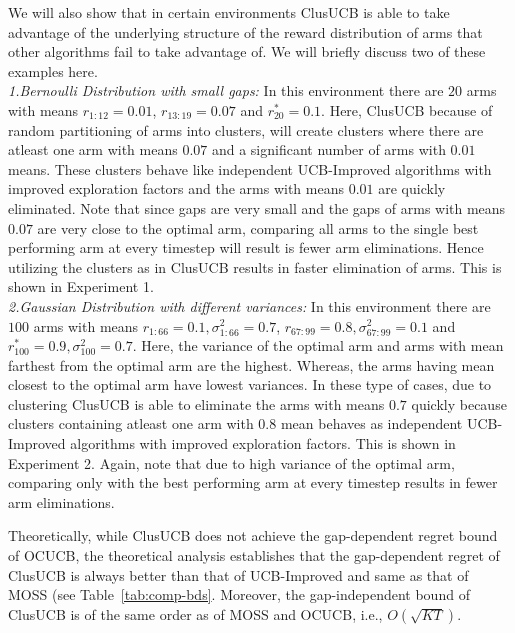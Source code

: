 We will also show that in certain environments ClusUCB is able to take advantage of the underlying structure of the reward distribution of arms that other algorithms fail to take advantage of. We will briefly discuss two of these examples here.
\\
\textit{1.Bernoulli Distribution with small gaps:} In this environment there are $20$ arms with means $r_{1:12}=0.01$, $r_{13:19}=0.07$ and $r_{20}^{*} =0.1$. Here, ClusUCB because of random partitioning of arms into clusters, will create clusters where there are atleast one arm with means $0.07$ and a significant number of arms with $0.01$ means. These clusters behave like independent UCB-Improved algorithms with improved exploration factors and the arms with means $0.01$ are quickly eliminated. Note that since gaps are very small and the gaps of arms with means $0.07$ are very close to the optimal arm, comparing all arms to the single best performing arm at every timestep will result is fewer arm eliminations. Hence utilizing the clusters as in ClusUCB results in faster elimination of arms. This is shown in Experiment 1.\\
\textit{2.Gaussian Distribution with different variances:} In this environment there are $100$ arms with means $r_{1:66}=0.1,\sigma_{1:66}^2 =0.7$, $r_{67:99}=0.8,\sigma_{67:99}^2 =0.1$ and $r_{100}^{*}=0.9, \sigma_{100}^2 =0.7$. Here, the variance of the optimal arm and arms with mean farthest from  the optimal arm are the highest. Whereas, the arms having mean closest to the optimal arm have lowest variances. In these type of cases, due to clustering ClusUCB is able to eliminate the arms with means $0.7$ quickly because clusters containing atleast one arm with $0.8$ mean behaves as independent UCB-Improved algorithms with improved exploration factors. This is shown in Experiment 2. Again, note that due to high variance of the optimal arm, comparing only with the best performing arm at every timestep results in fewer arm eliminations.

Theoretically, while ClusUCB does not achieve the gap-dependent regret bound of OCUCB, the theoretical analysis establishes that the gap-dependent regret of ClusUCB is always better than that of UCB-Improved and same as that of MOSS (see Table~\ref{tab:comp-bds}. Moreover, the gap-independent bound of ClusUCB is of the same order as of MOSS and OCUCB, i.e., $O\left(\sqrt{KT}\right)$. 


